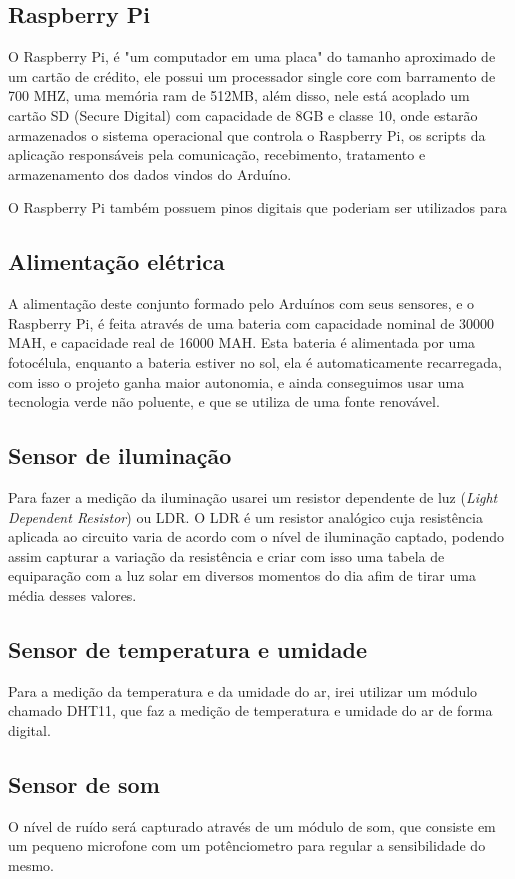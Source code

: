 \documentclass[final,12pt, times, 5p, twocolumn]{elsarticle}
\begin{document}
\subsection{Raspberry Pi}
O Raspberry Pi, é "um computador em uma placa" do tamanho aproximado de um cartão de crédito, ele possui um processador single core com barramento de 700 MHZ, uma memória ram de 512MB, além disso, nele está acoplado um cartão SD (Secure Digital) com capacidade de 8GB e classe 10, onde estarão armazenados o sistema operacional que controla o Raspberry Pi, os scripts da aplicação responsáveis pela comunicação, recebimento, tratamento e armazenamento dos dados vindos do Arduíno.

O Raspberry Pi também possuem pinos digitais que poderiam ser utilizados para 

\subsection{Alimentação elétrica}
A alimentação deste conjunto formado pelo Arduínos com seus sensores, e o Raspberry Pi, é feita através de uma bateria com capacidade nominal de 30000 MAH, e capacidade real de 16000 MAH. Esta bateria é alimentada por uma fotocélula, enquanto a bateria estiver no sol, ela é automaticamente recarregada, com isso o projeto ganha maior autonomia, e ainda conseguimos usar uma tecnologia verde\cite{tecnologia verde} não poluente, e que se utiliza de uma fonte renovável.

\subsection{Sensor de iluminação}
Para fazer a medição da iluminação usarei um resistor dependente de luz (\textit{Light Dependent Resistor}) ou LDR. O LDR é um resistor analógico cuja resistência aplicada ao circuito varia de acordo com o nível de iluminação captado, podendo assim capturar a variação da resistência e criar com isso uma tabela de equiparação com a luz solar em diversos momentos do dia afim de tirar uma média desses valores. 

\subsection{Sensor de temperatura e umidade}
Para a medição da temperatura e da umidade do ar, irei utilizar um módulo chamado DHT11, que faz a medição de temperatura e umidade do ar de forma digital.

\subsection{Sensor de som}
O nível de ruído será capturado através de um módulo de som, que consiste em um pequeno microfone com um potênciometro para regular a sensibilidade do mesmo.
\end{document}
